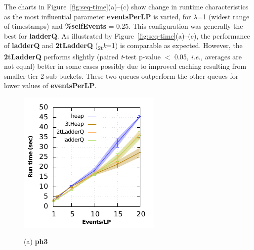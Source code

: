 The charts in Figure~\ref{fig:seq-time}(a)--(c) show change in runtime characteristics as the most influential parameter \textbf{eventsPerLP} is varied, for $\lambda$=1 (widest range of timestamps) and \textbf{\%self}\-\textbf{Events} = 0.25. This configuration was generally the best for \textbf{ladderQ}. As illustrated by Figure~\ref{fig:seq-time}(a)--(c), the performance of \textbf{ladderQ} and \textbf{2tLadderQ} (\textsubscript{2t}\textit{k}=1) is comparable as expected. However, the \textbf{2tLadderQ} performs slightly (paired \emph{t}-test p-value $<$ 0.05, \textit{i.e.,} averages are not equal) better in some cases possibly due to improved caching resulting from smaller tier-2 sub-buckets. These two queues outperform the other queues for lower values of \textbf{eventsPerLP}.

\begin{figure}
\begin{minipage}{0.24\linewidth}
\includegraphics[width=\linewidth]{images/ph3_run_time}
\centerline{(a) \textbf{ph3}}
\end{minipage}
\begin{minipage}{0.24\linewidth}

\end{minipage}
\end{figure}
